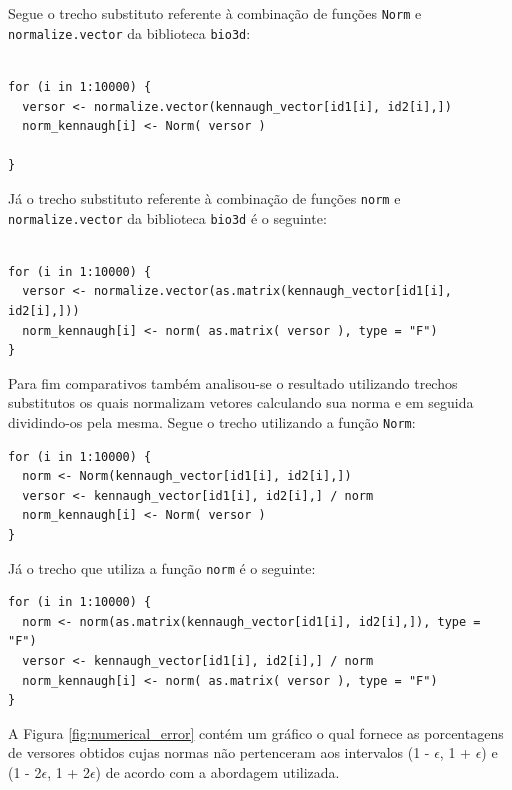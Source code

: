 \documentclass[12pt]{article}
\begin{document}
Segue o trecho substituto referente à combinação de funções \texttt{Norm} e \texttt{normalize.vector} da biblioteca \texttt{bio3d}:

\begin{verbatim}

for (i in 1:10000) {
  versor <- normalize.vector(kennaugh_vector[id1[i], id2[i],])
  norm_kennaugh[i] <- Norm( versor )
  
}
\end{verbatim}

Já o trecho substituto referente à combinação de funções \texttt{norm} e \texttt{normalize.vector} da biblioteca \texttt{bio3d} é o seguinte:

\begin{verbatim}

for (i in 1:10000) {
  versor <- normalize.vector(as.matrix(kennaugh_vector[id1[i], id2[i],]))
  norm_kennaugh[i] <- norm( as.matrix( versor ), type = "F")
}

\end{verbatim}

Para fim comparativos também analisou-se o resultado utilizando trechos substitutos os quais normalizam vetores calculando sua norma e em seguida dividindo-os pela mesma. Segue o trecho utilizando a função \texttt{Norm}:

\begin{verbatim}
for (i in 1:10000) {
  norm <- Norm(kennaugh_vector[id1[i], id2[i],])
  versor <- kennaugh_vector[id1[i], id2[i],] / norm
  norm_kennaugh[i] <- Norm( versor )
}
\end{verbatim}

Já o trecho que utiliza a função \texttt{norm} é o seguinte:

\begin{verbatim}
for (i in 1:10000) {
  norm <- norm(as.matrix(kennaugh_vector[id1[i], id2[i],]), type = "F")
  versor <- kennaugh_vector[id1[i], id2[i],] / norm
  norm_kennaugh[i] <- norm( as.matrix( versor ), type = "F")
}
\end{verbatim}

A Figura \ref{fig:numerical_error} contém um gráfico o qual fornece as porcentagens de versores obtidos cujas normas não pertenceram aos intervalos (1 - $\epsilon$, 1 + $\epsilon$) e (1 - 2$\epsilon$, 1 + 2$\epsilon$) de acordo com a abordagem utilizada.
\end{document}
